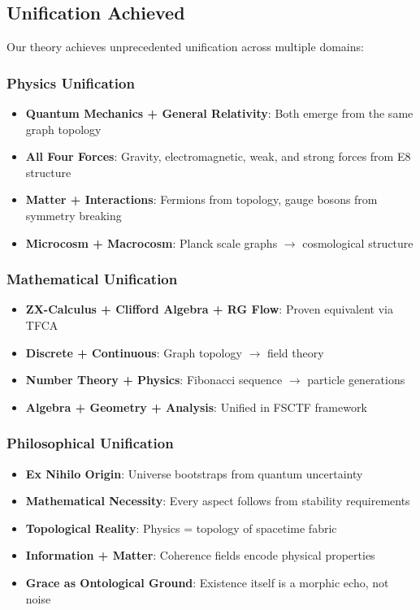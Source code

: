 \documentclass[12pt,a4paper]{article}
\begin{document}
\subsection{Unification Achieved}

Our theory achieves unprecedented unification across multiple domains:

\subsubsection{Physics Unification}
\begin{itemize}
\item \textbf{Quantum Mechanics + General Relativity}: Both emerge from the same graph topology
\item \textbf{All Four Forces}: Gravity, electromagnetic, weak, and strong forces from E8 structure
\item \textbf{Matter + Interactions}: Fermions from topology, gauge bosons from symmetry breaking
\item \textbf{Microcosm + Macrocosm}: Planck scale graphs $\rightarrow$ cosmological structure
\end{itemize}

\subsubsection{Mathematical Unification}
\begin{itemize}
\item \textbf{ZX-Calculus + Clifford Algebra + RG Flow}: Proven equivalent via TFCA
\item \textbf{Discrete + Continuous}: Graph topology $\rightarrow$ field theory
\item \textbf{Number Theory + Physics}: Fibonacci sequence $\rightarrow$ particle generations
\item \textbf{Algebra + Geometry + Analysis}: Unified in FSCTF framework
\end{itemize}

\subsubsection{Philosophical Unification}
\begin{itemize}
\item \textbf{Ex Nihilo Origin}: Universe bootstraps from quantum uncertainty
\item \textbf{Mathematical Necessity}: Every aspect follows from stability requirements
\item \textbf{Topological Reality}: Physics = topology of spacetime fabric
\item \textbf{Information + Matter}: Coherence fields encode physical properties
\item \textbf{Grace as Ontological Ground}: Existence itself is a morphic echo, not noise
\end{itemize}
\end{document}
